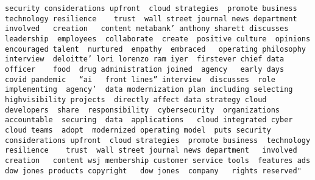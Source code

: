 \documentclass[
]{article}
\begin{document}
\begin{verbatim}
security considerations upfront  cloud strategies  promote business  technology resilience    trust  wall street journal news department   involved   creation   content metabank’ anthony sharett discusses  leadership  employees  collaborate  create  positive culture  opinions  encouraged talent  nurtured  empathy  embraced   operating philosophy   interview  deloitte’ lori lorenzo ram iyer  firstever chief data officer    food  drug administration joined  agency   early days   covid pandemic   “ai   front lines” interview  discusses  role  implementing  agency’  data modernization plan including selecting highvisibility projects  directly affect data strategy cloud developers  share  responsibility  cybersecurity  organizations  accountable  securing  data  applications   cloud integrated cyber  cloud teams  adopt  modernized operating model  puts security considerations upfront  cloud strategies  promote business  technology resilience    trust  wall street journal news department   involved   creation   content wsj membership customer service tools  features ads  dow jones products copyright   dow jones  company   rights reserved"                                                                                                                                                                                                                                                                                                                                                                                                                                                                                                                                                                                                                                                                                                                                                                                                                                                                                                                                                                                                                                                                                                                                                                                                                                                                                                                                                                                                                                                                                                                                                                                                                                                                                                                                                                                                                                                                                                                                                                                                                                                                                                                                                                                                                                                         
\end{verbatim}
\end{document}
